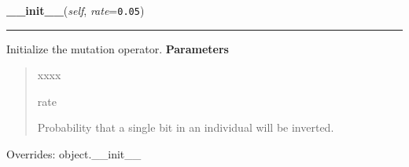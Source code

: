 \hspace{.8\funcindent}\begin{boxedminipage}{\funcwidth}

    \raggedright \textbf{\_\_init\_\_}(\textit{self}, \textit{rate}={\tt 0.05})

    \vspace{-1.5ex}

    \rule{\textwidth}{0.5\fboxrule}
\setlength{\parskip}{2ex}

Initialize the mutation operator.
\setlength{\parskip}{1ex}
      \textbf{Parameters}
      \vspace{-1ex}

      \begin{quote}
        \begin{Ventry}{xxxx}

          \item[rate]


Probability that a single bit in an individual will be inverted.
        \end{Ventry}

      \end{quote}

      Overrides: object.\_\_init\_\_

    \end{boxedminipage}

    \label{peach:ga:mutation:BitToBit:__call__}

    \vspace{0.5ex}

